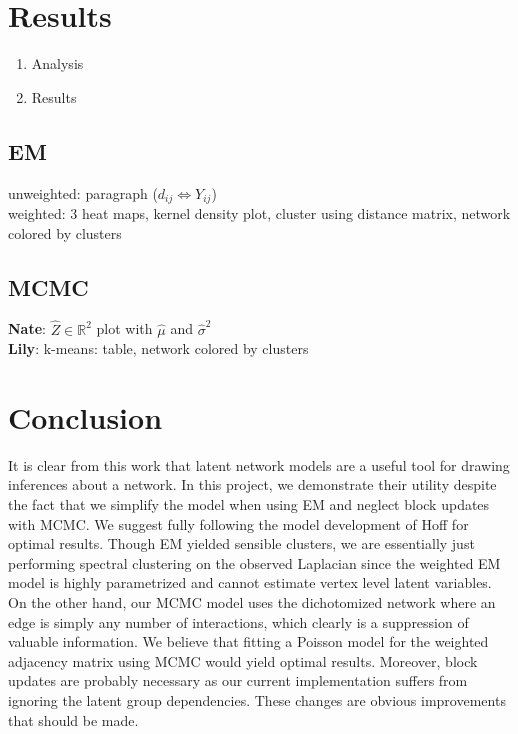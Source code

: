 \documentclass{article}
\begin{document}
\section{Results} \label{Results}
\begin{enumerate}
    \item Analysis
    \item Results
\end{enumerate}

\subsection{EM}

unweighted: paragraph ($d_{ij} \iff Y_{ij}$)\\

weighted: 3 heat maps, kernel density plot, cluster using distance matrix, network colored by clusters

\subsection{MCMC}

\textbf{Nate}: $\hat{Z} \in \mathbb{R}^2$ plot with $\hat{\mu}$ and $\hat{\sigma}^2$\\

\textbf{Lily}: k-means: table, network colored by clusters

\section{Conclusion} \label{Conclusion}

It is clear from this work that latent network models are a useful tool for drawing inferences about a network. In this project, we demonstrate their utility despite the fact that we simplify the model when using EM and neglect block updates with MCMC. We suggest fully following the model development of Hoff for optimal results. Though EM yielded sensible clusters, we are essentially just performing spectral clustering on the observed Laplacian since the weighted EM model is highly parametrized and cannot estimate vertex level latent variables. On the other hand, our MCMC model uses the dichotomized network where an edge is simply any number of interactions, which clearly is a suppression of valuable information. We believe that fitting a Poisson model for the weighted adjacency matrix using MCMC would yield optimal results. Moreover, block updates are probably necessary as our current implementation suffers from ignoring the latent group dependencies. These changes are obvious improvements that should be made.
\end{document}
